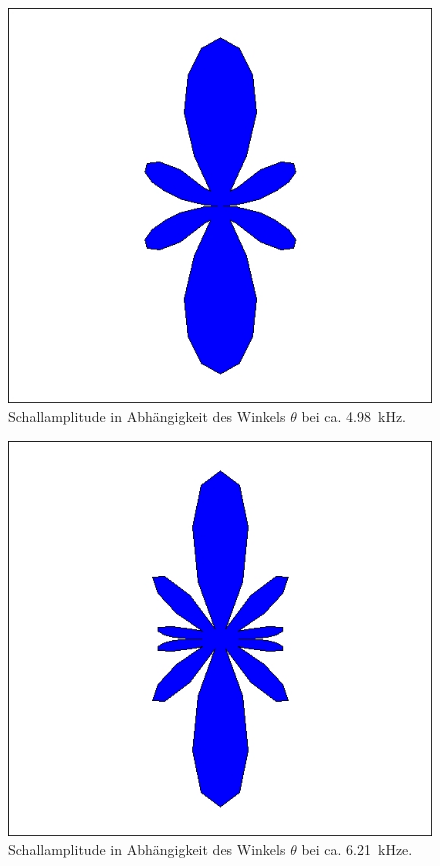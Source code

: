 \begin{figure}
\centering
\includegraphics[width=\textwidth]{content/messungen/Chapter2new/2_3_3.jpg}
\caption{Schallamplitude in Abhängigkeit des Winkels $\theta$ bei ca. 4.98~kHz.}
\label{fig:2_3_3}
\end{figure}

\begin{figure}
\centering
\includegraphics[width=\textwidth]{content/messungen/Chapter2new/2_3_4.jpg}
\caption{Schallamplitude in Abhängigkeit des Winkels $\theta$ bei ca. 6.21~kHze.}
\label{fig:2_3_4}
\end{figure}

